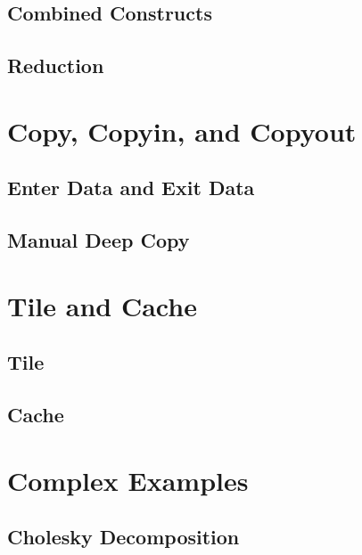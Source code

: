 \documentclass{article}
\begin{document}
\subsection{Combined Constructs}


\subsection{Reduction}


\newpage
\section{Copy, Copyin, and Copyout}


\newpage
\subsection{Enter Data and Exit Data}


\newpage
\subsection{Manual Deep Copy}


\newpage
\section{Tile and Cache}


\newpage
\subsection{Tile}


\newpage
\subsection{Cache}


\newpage
\section{Complex Examples}


\newpage
\subsection{Cholesky Decomposition}


\newpage
\printbibliography
\end{document}
